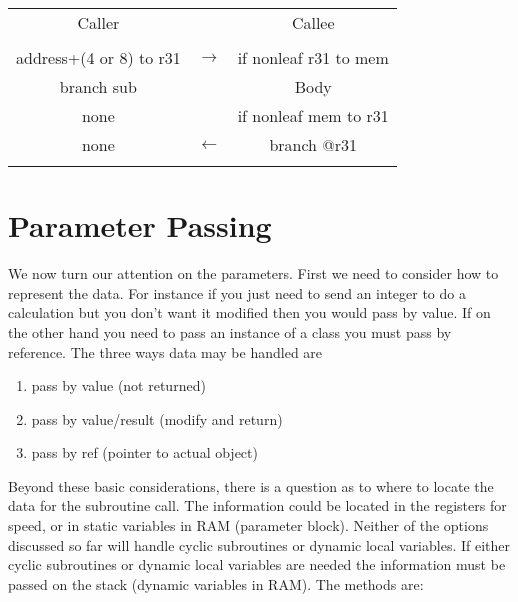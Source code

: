 \begin{tabular}{|c|c|c|}
  \multicolumn{1}{c}{Caller} & \multicolumn{1}{c}{ } & \multicolumn{1}{c}{Callee} \\
  & & \\
  \cline{1-1} \cline{3-3}
  address+(4 or 8) to r31  & $\rightarrow$ & if nonleaf r31 to mem \\ \cline{3-3}
  branch sub     &   & Body \\ \cline{1-1} \cline{3-3}
  none           &   & if nonleaf mem to r31 \\
  none           & $\leftarrow$ & branch @r31 \\ \cline{1-1} \cline{3-3}
  & & \\
\end{tabular}

\section{Parameter Passing}

We now turn our attention on the parameters.  First we need to consider how to represent the data.  For instance if you just need to send an integer to do a calculation but you don't want it modified then you would pass by value.  If on the other hand you need to pass an instance of a class you must pass by reference.  The three ways data may be handled are

\begin{enumerate}
    \item pass by value (not returned)
    \item pass by value/result (modify and return)
    \item pass by ref (pointer to actual object)
\end{enumerate}

Beyond these basic considerations, there is a question as to where to locate the data for the subroutine call.  The information could be located in the registers for speed, or in static variables in RAM (parameter block).  Neither of the options discussed so far will handle cyclic subroutines or dynamic local variables.  If either cyclic subroutines or dynamic local variables are needed the information must be passed on the stack (dynamic variables in RAM).  The methods are:


